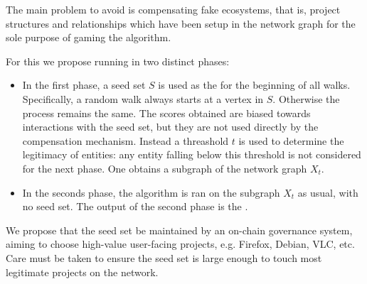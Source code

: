 The main problem to avoid is compensating fake ecosystems, that is,
project structures and relationships which have been setup in the
network graph for the sole purpose of gaming the \osrank{} algorithm.

For this we propose running \osrank{} in two distinct phases:
\begin{itemize}
\item In the first phase, a seed set $S$ is used as the for the
  beginning of all walks. Specifically, a random walk always starts at
  a vertex in $S$. Otherwise the process remains the same. The scores
  obtained are biased towards interactions with the seed set, but they
  are not used directly by the compensation mechanism. Instead a
  threashold $t$ is used to determine the legitimacy of entities: any
  entity falling below this threshold is not considered for the next
  phase. One obtains a subgraph of the network graph $X_t$.
\item In the seconds phase, the algorithm is ran on the subgraph $X_t$
  as usual, with no seed set. The output of the second phase is the
  \osrank{}.
\end{itemize}

We propose that the seed set be maintained by an on-chain governance
system, aiming to choose high-value user-facing projects,
e.g. Firefox, Debian, VLC, etc. Care must be taken to ensure the seed
set is large enough to touch most legitimate projects on the network.



